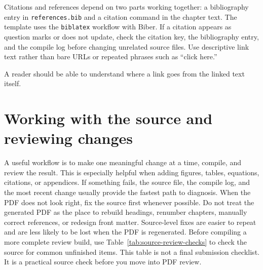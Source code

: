 Citations and references depend on two parts working together: a bibliography entry in \texttt{references.bib} and a citation command in the chapter text. The template uses the \texttt{biblatex} workflow with Biber. If a citation appears as question marks or does not update, check the citation key, the bibliography entry, and the compile log before changing unrelated source files. Use descriptive link text rather than bare URLs or repeated phrases such as ``click here.''

A reader should be able to understand where a link goes from the linked text itself.



\section{Working with the source and reviewing changes}
\label{sec:working-reviewing}

A useful workflow is to make one meaningful change at a time, compile, and review the result. This is especially helpful when adding figures, tables, equations, citations, or appendices. If something fails, the source file, the compile log, and the most recent change usually provide the fastest path to diagnosis.
When the PDF does not look right, fix the source first whenever possible. Do not treat the generated PDF as the place to rebuild headings, renumber chapters, manually correct references, or redesign front matter. Source-level fixes are easier to repeat and are less likely to be lost when the PDF is regenerated. Before compiling a more complete review build, use Table~\ref{tab:source-review-checks} to check the source for common unfinished items. This table is not a final submission checklist. It is a practical source check before you move into PDF review.

